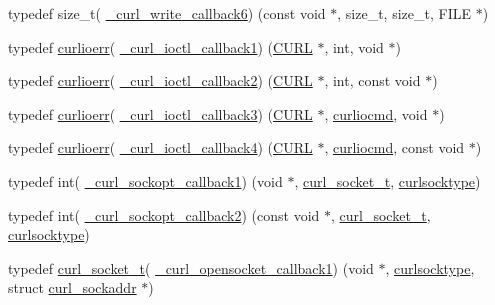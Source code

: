 \begin{DoxyCompactItemize}
\item 
typedef size\+\_\+t( \hyperlink{typecheck-gcc_8h_a7d38c5964bcf80455b4ac9fccb3bc4c3}{\+\_\+curl\+\_\+write\+\_\+callback6}) (const void $\ast$, size\+\_\+t, size\+\_\+t, F\+I\+L\+E $\ast$)
\item 
typedef \hyperlink{curl_8h_aed08c6203949f0b52a655e094f241920}{curlioerr}( \hyperlink{typecheck-gcc_8h_aac1891bdfef140df9bb64a06ed047fcc}{\+\_\+curl\+\_\+ioctl\+\_\+callback1}) (\hyperlink{curl_8h_ace655e3633b6533591283994d6b5cdda}{C\+U\+R\+L} $\ast$, int, void $\ast$)
\item 
typedef \hyperlink{curl_8h_aed08c6203949f0b52a655e094f241920}{curlioerr}( \hyperlink{typecheck-gcc_8h_afcf7a9e1d185d392c778b714db3112d1}{\+\_\+curl\+\_\+ioctl\+\_\+callback2}) (\hyperlink{curl_8h_ace655e3633b6533591283994d6b5cdda}{C\+U\+R\+L} $\ast$, int, const void $\ast$)
\item 
typedef \hyperlink{curl_8h_aed08c6203949f0b52a655e094f241920}{curlioerr}( \hyperlink{typecheck-gcc_8h_ae7c200fd4adb189b92a5373f59711ef8}{\+\_\+curl\+\_\+ioctl\+\_\+callback3}) (\hyperlink{curl_8h_ace655e3633b6533591283994d6b5cdda}{C\+U\+R\+L} $\ast$, \hyperlink{curl_8h_a3781556120d1f44d126ef1cf50019cf4}{curliocmd}, void $\ast$)
\item 
typedef \hyperlink{curl_8h_aed08c6203949f0b52a655e094f241920}{curlioerr}( \hyperlink{typecheck-gcc_8h_ab1a3806b61adfbc7040daf6f6d115f02}{\+\_\+curl\+\_\+ioctl\+\_\+callback4}) (\hyperlink{curl_8h_ace655e3633b6533591283994d6b5cdda}{C\+U\+R\+L} $\ast$, \hyperlink{curl_8h_a3781556120d1f44d126ef1cf50019cf4}{curliocmd}, const void $\ast$)
\item 
typedef int( \hyperlink{typecheck-gcc_8h_a32154ca77f61d2dec71eecd83f9416ca}{\+\_\+curl\+\_\+sockopt\+\_\+callback1}) (void $\ast$, \hyperlink{curl_8h_adb5a46d02359d2379dc7e0904c987828}{curl\+\_\+socket\+\_\+t}, \hyperlink{curl_8h_ae319cab849319fca1b222de282506ad9}{curlsocktype})
\item 
typedef int( \hyperlink{typecheck-gcc_8h_ababbf83b9d0907aa6938998a4bf0b6b8}{\+\_\+curl\+\_\+sockopt\+\_\+callback2}) (const void $\ast$, \hyperlink{curl_8h_adb5a46d02359d2379dc7e0904c987828}{curl\+\_\+socket\+\_\+t}, \hyperlink{curl_8h_ae319cab849319fca1b222de282506ad9}{curlsocktype})
\item 
typedef \hyperlink{curl_8h_adb5a46d02359d2379dc7e0904c987828}{curl\+\_\+socket\+\_\+t}( \hyperlink{typecheck-gcc_8h_a3e4f955d1af288f560f2cad5991caa14}{\+\_\+curl\+\_\+opensocket\+\_\+callback1}) (void $\ast$, \hyperlink{curl_8h_ae319cab849319fca1b222de282506ad9}{curlsocktype}, struct \hyperlink{structcurl__sockaddr}{curl\+\_\+sockaddr} $\ast$)

\end{DoxyCompactItemize}
